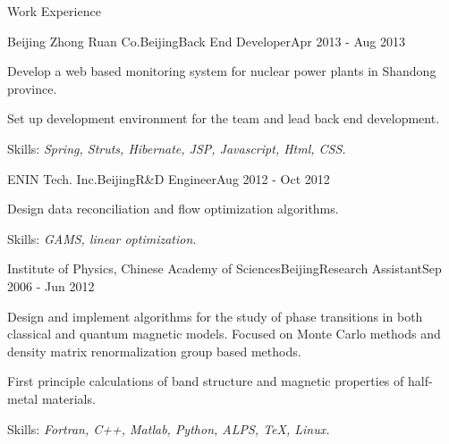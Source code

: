 \documentclass{resume} %
\begin{document}
\begin{rSection}{Work Experience}
\begin{rSubsection}{Beijing Zhong Ruan Co.}{Beijing}{Back End Developer}{Apr 2013 - Aug 2013}{}{}
\item Develop a web based monitoring system for nuclear power plants in Shandong province.
\item Set up development environment for the team and lead back end development.
\item Skills: {\it Spring, Struts, Hibernate, JSP, Javascript, Html, CSS.}
\end{rSubsection}

\begin{rSubsection}{ENIN Tech. Inc.}{Beijing}{R\&D Engineer}{Aug 2012 - Oct 2012}{}{}
\item Design data reconciliation and flow optimization algorithms.
\item Skills: {\it GAMS, linear optimization.}
\end{rSubsection}

\begin{rSubsection}{Institute of Physics, Chinese Academy of Sciences}{Beijing}{Research Assistant}{Sep 2006 - Jun 2012}{}{}
\item Design and implement algorithms for the study of phase transitions in both classical and quantum magnetic models. Focused on Monte Carlo methods and density matrix renormalization group based methods.
\item First principle calculations of band structure and magnetic properties of half-metal materials.
\item Skills: {\it Fortran, C++, Matlab, Python, ALPS, \TeX, Linux.}
\end{rSubsection}

\end{rSection}
\end{document}
